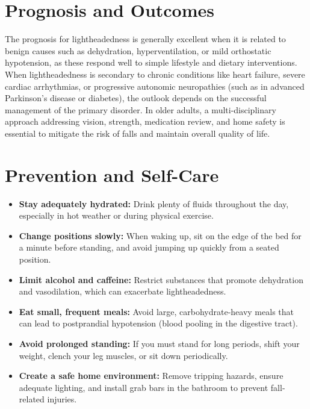 \section*{Prognosis and Outcomes}
The prognosis for lightheadedness is generally excellent when it is related to benign causes such as dehydration, hyperventilation, or mild orthostatic hypotension, as these respond well to simple lifestyle and dietary interventions. When lightheadedness is secondary to chronic conditions like heart failure, severe cardiac arrhythmias, or progressive autonomic neuropathies (such as in advanced Parkinson's disease or diabetes), the outlook depends on the successful management of the primary disorder. In older adults, a multi-disciplinary approach addressing vision, strength, medication review, and home safety is essential to mitigate the risk of falls and maintain overall quality of life.

\section*{Prevention and Self-Care}
\begin{itemize}
    \item \textbf{Stay adequately hydrated:} Drink plenty of fluids throughout the day, especially in hot weather or during physical exercise.
    \item \textbf{Change positions slowly:} When waking up, sit on the edge of the bed for a minute before standing, and avoid jumping up quickly from a seated position.
    \item \textbf{Limit alcohol and caffeine:} Restrict substances that promote dehydration and vasodilation, which can exacerbate lightheadedness.
    \item \textbf{Eat small, frequent meals:} Avoid large, carbohydrate-heavy meals that can lead to postprandial hypotension (blood pooling in the digestive tract).
    \item \textbf{Avoid prolonged standing:} If you must stand for long periods, shift your weight, clench your leg muscles, or sit down periodically.
    \item \textbf{Create a safe home environment:} Remove tripping hazards, ensure adequate lighting, and install grab bars in the bathroom to prevent fall-related injuries.
\end{itemize}

